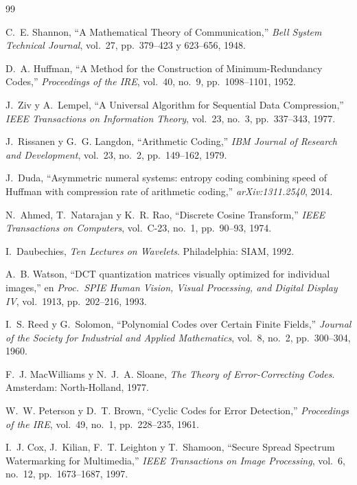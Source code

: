 \documentclass[12pt,a4paper]{article}
\begin{document}
\begin{thebibliography}{99}

C.~E. Shannon, ``A Mathematical Theory of Communication,''
\emph{Bell System Technical Journal}, vol.~27, pp.~379--423 y 623--656, 1948.

D.~A. Huffman, ``A Method for the Construction of Minimum-Redundancy Codes,''
\emph{Proceedings of the IRE}, vol.~40, no.~9, pp.~1098--1101, 1952.

J.~Ziv y A.~Lempel, ``A Universal Algorithm for Sequential Data Compression,''
\emph{IEEE Transactions on Information Theory}, vol.~23, no.~3, pp.~337--343, 1977.

J.~Rissanen y G.~G. Langdon, ``Arithmetic Coding,''
\emph{IBM Journal of Research and Development}, vol.~23, no.~2, pp.~149--162, 1979.

J.~Duda, ``Asymmetric numeral systems: entropy coding combining speed of Huffman
with compression rate of arithmetic coding,''
\emph{arXiv:1311.2540}, 2014.

N.~Ahmed, T.~Natarajan y K.~R. Rao, ``Discrete Cosine Transform,''
\emph{IEEE Transactions on Computers}, vol.~C-23, no.~1, pp.~90--93, 1974.

I.~Daubechies, \emph{Ten Lectures on Wavelets}. Philadelphia: SIAM, 1992.

A.~B. Watson, ``DCT quantization matrices visually optimized for individual
images,'' en \emph{Proc.\ SPIE Human Vision, Visual Processing, and Digital
Display IV}, vol.~1913, pp.~202--216, 1993.

I.~S. Reed y G.~Solomon, ``Polynomial Codes over Certain Finite Fields,''
\emph{Journal of the Society for Industrial and Applied Mathematics}, vol.~8,
no.~2, pp.~300--304, 1960.

F.~J. MacWilliams y N.~J.~A. Sloane, \emph{The Theory of Error-Correcting Codes}.
Amsterdam: North-Holland, 1977.

W.~W. Peterson y D.~T. Brown, ``Cyclic Codes for Error Detection,''
\emph{Proceedings of the IRE}, vol.~49, no.~1, pp.~228--235, 1961.

I.~J. Cox, J.~Kilian, F.~T. Leighton y T.~Shamoon, ``Secure Spread Spectrum
Watermarking for Multimedia,'' \emph{IEEE Transactions on Image Processing},
vol.~6, no.~12, pp.~1673--1687, 1997.


\end{thebibliography}
\end{document}
